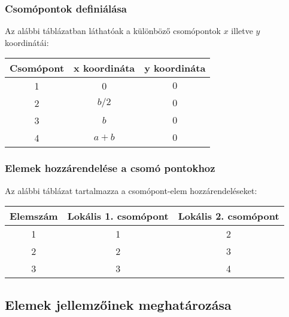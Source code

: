 \documentclass[12pt,a4paper]{article}
\begin{document}
\subsubsection{Csomópontok definiálása}
Az alábbi táblázatban láthatóak a különböző csomópontok $x$ illetve
$y$ koordinátái:
\begin{center}
    \begin{tabular}{|c|c|c|}
        \hline
        Csomópont & x koordináta & y koordináta \\
        \hline
        \hline
        1         & 0            & $0$          \\
        \hline
        2         & $b/2$        & $0$          \\
        \hline
        3         & $b$          & $0$          \\
        \hline
        4         & $a+b$        & $0$          \\
        \hline
    \end{tabular}
\end{center}

\subsubsection{Elemek hozzárendelése a csomó pontokhoz}
Az alábbi táblázat tartalmazza a csomópont-elem hozzárendeléseket:
\begin{center}
    \begin{tabular}{|c|c|c|}
        \hline
        Elemszám & Lokális 1. csomópont & Lokális 2. csomópont \\
        \hline
        \hline
        1        & 1                    & 2                    \\
        \hline
        2        & 2                    & 3                    \\
        \hline
        3        & 3                    & 4                    \\
        \hline
    \end{tabular}
\end{center}
\subsection{Elemek jellemzőinek meghatározása}
\end{document}
